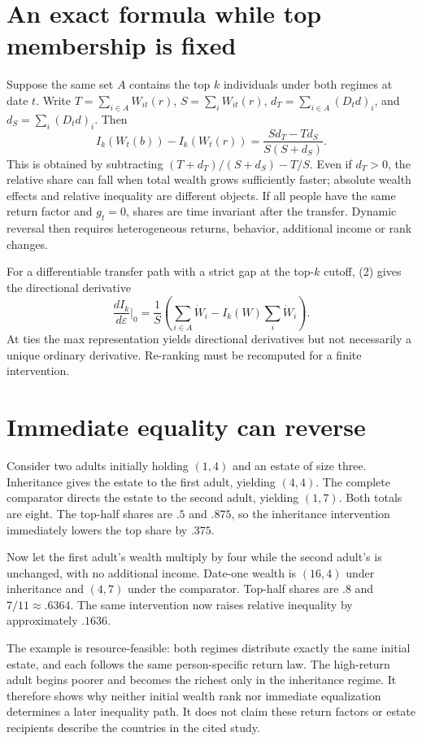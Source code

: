 \documentclass[11pt]{article}
\begin{document}
\section*{An exact formula while top membership is fixed}
Suppose the same set $A$ contains the top $k$ individuals under both regimes at date $t$. Write $T=\sum_{i\in A}W_{it}(r)$, $S=\sum_iW_{it}(r)$, $d_T=\sum_{i\in A}(D_td)_i$, and $d_S=\sum_i(D_td)_i$. Then
\[
 I_k(W_t(b))-I_k(W_t(r))
 =\frac{Sd_T-Td_S}{S(S+d_S)}.                        \tag{2}
\]
This is obtained by subtracting $(T+d_T)/(S+d_S)-T/S$. Even if $d_T>0$, the relative share can fall when total wealth grows sufficiently faster; absolute wealth effects and relative inequality are different objects. If all people have the same return factor and $g_t=0$, shares are time invariant after the transfer. Dynamic reversal then requires heterogeneous returns, behavior, additional income or rank changes.

For a differentiable transfer path with a strict gap at the top-$k$ cutoff, (2) gives the directional derivative
\[
 \frac{dI_k}{d\varepsilon}\bigg|_0
 =\frac{1}{S}\left(\sum_{i\in A}\dot W_i-I_k(W)\sum_i\dot W_i\right).
\]
At ties the max representation yields directional derivatives but not necessarily a unique ordinary derivative. Re-ranking must be recomputed for a finite intervention.

\section*{Immediate equality can reverse}
Consider two adults initially holding $(1,4)$ and an estate of size three. Inheritance gives the estate to the first adult, yielding $(4,4)$. The complete comparator directs the estate to the second adult, yielding $(1,7)$. Both totals are eight. The top-half shares are $.5$ and $.875$, so the inheritance intervention immediately lowers the top share by $.375$.

Now let the first adult's wealth multiply by four while the second adult's is unchanged, with no additional income. Date-one wealth is $(16,4)$ under inheritance and $(4,7)$ under the comparator. Top-half shares are $.8$ and $7/11\approx.6364$. The same intervention now raises relative inequality by approximately $.1636$.

The example is resource-feasible: both regimes distribute exactly the same initial estate, and each follows the same person-specific return law. The high-return adult begins poorer and becomes the richest only in the inheritance regime. It therefore shows why neither initial wealth rank nor immediate equalization determines a later inequality path. It does not claim these return factors or estate recipients describe the countries in the cited study.
\end{document}
